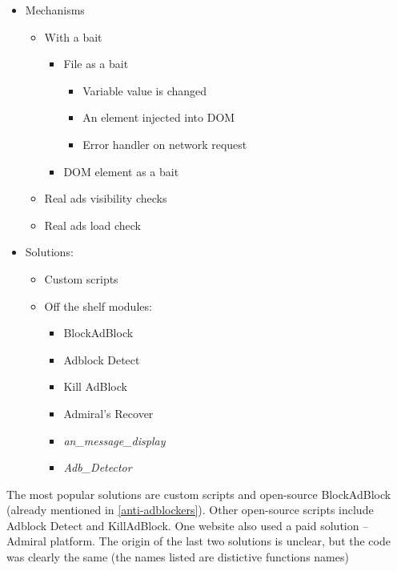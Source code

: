 \begin{itemize}
  \item Mechanisms
    \begin{itemize}
      \item With a bait
        \begin{itemize}
         \item File as a bait
         \begin{itemize}
           \item Variable value is changed
           \item An element injected into DOM
           \item Error handler on network request
         \end{itemize}
           \item DOM element as a bait
        \end{itemize}
      \item Real ads visibility checks
      \item Real ads load check
    \end{itemize}
  \item Solutions:
    \begin{itemize}
      \item Custom scripts
      \item Off the shelf modules:
        \begin{itemize}
          \item BlockAdBlock \cite{github:blockadblock}
          \item Adblock Detect \cite{adblock-detect}
          \item Kill AdBlock \cite{kill-adblock}
          \item Admiral's Recover \cite{admiral:recover}
          \item \emph{an\_message\_display}
          \item \emph{Adb\_Detector}
        \end{itemize}
    \end{itemize}
\end{itemize}

The most popular solutions are custom scripts and open-source BlockAdBlock (already mentioned in \ref{anti-adblockers}).
Other open-source scripts include Adblock Detect and KillAdBlock. One website also used a paid solution -- Admiral platform.
The origin of the last two solutions is unclear, but the code was clearly the same (the names listed are 
distictive functions names)

